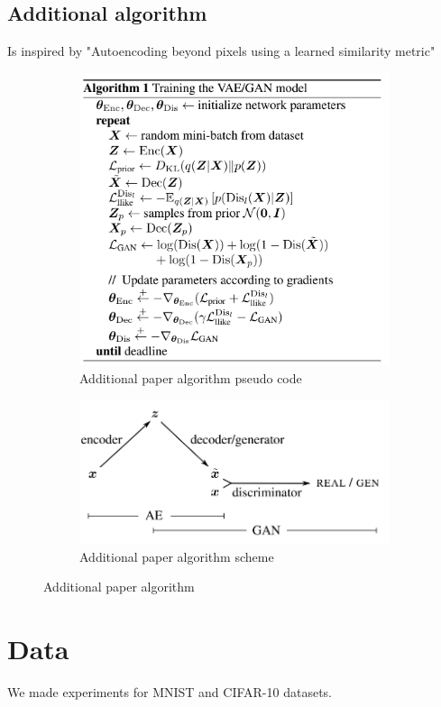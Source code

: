 \documentclass{article}
\begin{document}
    \subsection{Additional algorithm}
    Is inspired by "Autoencoding beyond pixels using a learned similarity metric"\cite{DBLP:journals/corr/LarsenSW15}
    \begin{center}
        \begin{figure}[H]{\textwidth}
            \begin{subfigure}{0.5\textwidth}
                \centering
                \includegraphics[width=0.5\linewidth]{figures/additional-code.png}
                \caption{Additional paper algorithm pseudo code}
            \end{subfigure}
            \begin{subfigure}{0.5\textwidth}
                \centering
                \includegraphics[width=0.5\linewidth]{figures/additional.png}
                \caption{Additional paper algorithm scheme}
            \end{subfigure}%
            \caption{Additional paper algorithm}
        \end{figure}
    \end{center}


    \section{Data}
    We made experiments for MNIST and CIFAR-10 datasets.
\end{document}
